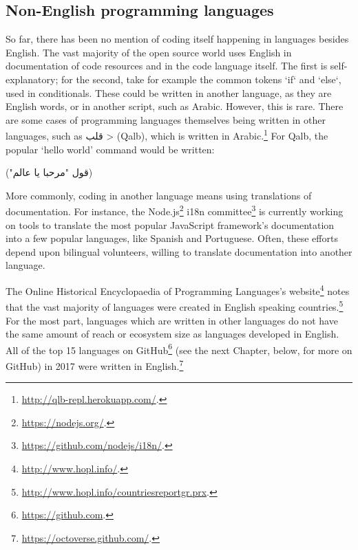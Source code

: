 \subsection{Non-English programming languages}


So far, there has been no mention of coding itself happening in languages besides English. The vast majority of the open source world uses English in documentation of code resources and in the code language itself. The first is self-explanatory; for the second, take for example the common tokens `if` and `else`, used in conditionals. These could be written in another language, as they are English words, or in another script, such as Arabic. However, this is rare. There are some cases of programming languages themselves being written in other languages, such as \< قلب > (Qalb), which is written in Arabic.\footnote{\href{http://qlb-repl.herokuapp.com/}{http://qlb-repl.herokuapp.com/}. } For Qalb, the popular `hello world' command would be written:

\begin{arabtext}
(قول "مرحبا يا عالم"‏)
\end{arabtext}

More commonly, coding in another language means using translations of documentation. For instance, the Node.js\footnote{\href{https://nodejs.org/}{https://nodejs.org/}. } i18n committee\footnote{\href{https://github.com/nodejs/i18n/}{https://github.com/nodejs/i18n/}. } is currently working on tools to translate the most popular JavaScript framework's documentation into a few popular languages, like Spanish and Portuguese. Often, these efforts depend upon bilingual volunteers, willing to translate documentation into another language.

The Online Historical Encyclopaedia of Programming Languages's website\footnote{\href{http://www.hopl.info/}{http://www.hopl.info/}. } notes that the vast majority of languages were created in English speaking countries.\footnote{\href{http://www.hopl.info/countriesreportgr.prx}{http://www.hopl.info/countriesreportgr.prx}. } For the most part, languages which are written in other languages do not have the same amount of reach or ecosystem size as languages developed in English. All of the top 15 languages on GitHub\footnote{\href{https://www.github.com}{https://github.com}. } (see the next Chapter, below, for more on GitHub) in 2017 were written in English.\footnote{\href{https://octoverse.github.com/}{https://octoverse.github.com/}. }

